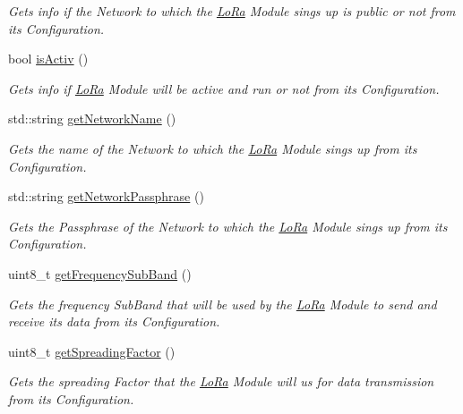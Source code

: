\begin{DoxyCompactItemize}
\begin{DoxyCompactList}\small\item\em Gets info if the Network to which the \hyperlink{class_lo_ra}{Lo\+Ra} Module sings up is public or not from its Configuration. \end{DoxyCompactList}\item 
bool \hyperlink{class_lo_ra_config_a07a0194fa9a1a7946d2894b8ba28339d}{is\+Activ} ()
\begin{DoxyCompactList}\small\item\em Gets info if \hyperlink{class_lo_ra}{Lo\+Ra} Module will be active and run or not from its Configuration. \end{DoxyCompactList}\item 
std\+::string \hyperlink{class_lo_ra_config_a418b6f51436522a6319591aecd8e8841}{get\+Network\+Name} ()
\begin{DoxyCompactList}\small\item\em Gets the name of the Network to which the \hyperlink{class_lo_ra}{Lo\+Ra} Module sings up from its Configuration. \end{DoxyCompactList}\item 
std\+::string \hyperlink{class_lo_ra_config_a2e55d17633dd7f25bdd672b91a1d81b4}{get\+Network\+Passphrase} ()
\begin{DoxyCompactList}\small\item\em Gets the Passphrase of the Network to which the \hyperlink{class_lo_ra}{Lo\+Ra} Module sings up from its Configuration. \end{DoxyCompactList}\item 
uint8\+\_\+t \hyperlink{class_lo_ra_config_ae6246cc57369f37d5098edf67253d8b4}{get\+Frequency\+Sub\+Band} ()
\begin{DoxyCompactList}\small\item\em Gets the frequency Sub\+Band that will be used by the \hyperlink{class_lo_ra}{Lo\+Ra} Module to send and receive its data from its Configuration. \end{DoxyCompactList}\item 
uint8\+\_\+t \hyperlink{class_lo_ra_config_a0f59725c879cbe252dd078caced161c8}{get\+Spreading\+Factor} ()
\begin{DoxyCompactList}\small\item\em Gets the spreading Factor that the \hyperlink{class_lo_ra}{Lo\+Ra} Module will us for data transmission from its Configuration. \end{DoxyCompactList}\item 

\end{DoxyCompactItemize}

